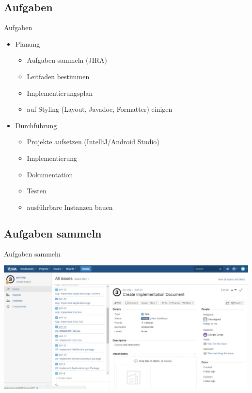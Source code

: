 \documentclass[19pt]{beamer}
\begin{document}
\subsection{Aufgaben}
\begin{frame}{Aufgaben}
	\begin{itemize}
		\item Planung
		\pause
		\begin{itemize}
			\item Aufgaben sammeln (JIRA)
			\pause
			\item Leitfaden bestimmen
			\pause
			\item Implementierungsplan
			\pause
			\item auf Styling (Layout, Javadoc, Formatter) einigen
			\pause
		\end{itemize}
		\item Durchführung
		\pause
		\begin{itemize}
			\item Projekte aufsetzen (IntelliJ/Android Studio)
			\pause
			\item Implementierung
			\pause
			\item Dokumentation
			\pause
			\item Testen
			\pause
			\item ausführbare Instanzen bauen
		\end{itemize}
	\end{itemize}
\end{frame}

\subsection{Aufgaben sammeln}

\begin{frame}{Aufgaben sammeln}
	\begin{center}
		\includegraphics[scale=0.3]{resources/Jira.jpg}
	\end{center}
\end{frame}
\end{document}
